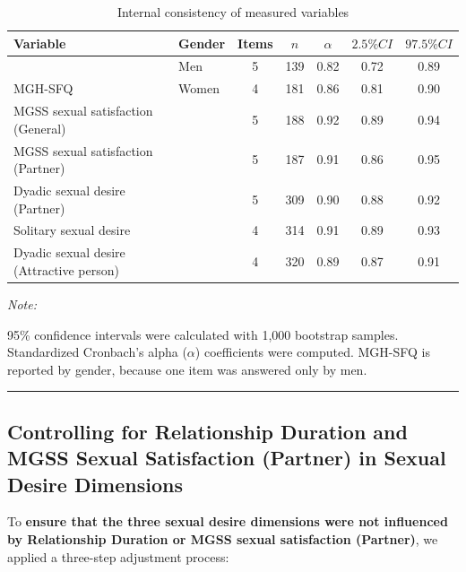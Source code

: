 \documentclass[
  bookmarksnumbered]{article}
\begin{document}
\begin{table}[H]
\centering
\caption{\label{tab:Cronbach-tab}Internal consistency of measured variables}
\centering
\begin{threeparttable}
\begin{tabular}[t]{llccccc}
\toprule
Variable & Gender & Items & $n$ & $\alpha$ & $2.5\% CI$ & $97.5\% CI$\\
\midrule
 & Men & 5 & 139 & 0.82 & 0.72 & 0.89\\
\cmidrule{2-7}
\multirow{-2}{*}{\raggedright\arraybackslash MGH-SFQ} & Women & 4 & 181 & 0.86 & 0.81 & 0.90\\
\cmidrule{1-7}
MGSS sexual satisfaction (General) &  & 5 & 188 & 0.92 & 0.89 & 0.94\\
\cmidrule{1-7}
MGSS sexual satisfaction (Partner) &  & 5 & 187 & 0.91 & 0.86 & 0.95\\
\cmidrule{1-7}
Dyadic sexual desire (Partner) &  & 5 & 309 & 0.90 & 0.88 & 0.92\\
\cmidrule{1-7}
Solitary sexual desire &  & 4 & 314 & 0.91 & 0.89 & 0.93\\
\cmidrule{1-7}
Dyadic sexual desire (Attractive person) &  & 4 & 320 & 0.89 & 0.87 & 0.91\\
\bottomrule
\end{tabular}
\begin{tablenotes}[para]
\item \textit{Note: } 
\item 95\% confidence intervals were calculated with 1,000 bootstrap samples.
           Standardized Cronbach's alpha ($\alpha$) coefficients were computed.
           MGH-SFQ is reported by gender, because one item was answered only by men.
\end{tablenotes}
\end{threeparttable}
\end{table}

\begin{center}\rule{0.5\linewidth}{0.5pt}\end{center}

\subsection{Controlling for Relationship Duration and MGSS Sexual Satisfaction (Partner) in Sexual Desire Dimensions}\label{controlling-for-relationship-duration-and-mgss-sexual-satisfaction-partner-in-sexual-desire-dimensions}

To \textbf{ensure that the three sexual desire dimensions were not influenced by Relationship Duration or MGSS sexual satisfaction (Partner)}, we applied a three-step adjustment process:
\end{document}
